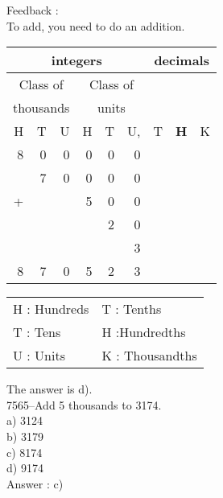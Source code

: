 \documentclass[letterpaper, 12pt]{article}
\begin{document}
Feedback :\\
To add, you need to do an addition.
\begin{center}
\begin{tabular}{|rrr|rrr|rrr|}
\hline
\multicolumn{6}{|c|}{integers} &\multicolumn{3}{|c|}{decimals} \\
\hline
\multicolumn{3}{|c|}{Class of} &\multicolumn{3}{|c|}{Class of} &  \multicolumn{3}{c|}{} \\
\multicolumn{3}{|c|}{thousands} &\multicolumn{3}{|c|}{units} &  \multicolumn{3}{c|}{} \\
\hline
H & T & U &H & T & U, & T\up{th} & \textbf{H\up{th}} & K\up{th} \\
\hline
\hline
8 & 0 & 0 & 0 & 0 & 0 &  & &\\
 & 7 & 0 & 0 & 0 & 0 &  & &\\
+ &  &  & 5 & 0 & 0 &  & &\\
 &  &  &  & 2 & 0 &  & &\\
 &  &  &  &  & 3 &  & &\\
\hline
\hline
 8 & 7 & 0 & 5 & 2 & 3 &  & &
\\
\hline
\end{tabular}
\end{center}

\scriptsize
\begin{center}
\begin{tabular}{ll}
H : Hundreds & T\up{th} : Tenths\\
T : Tens & H\up{th} :Hundredths\\
U : Units & K\up{e} : Thousandths\\
\end{tabular}
\end{center}

\normalsize
The answer is d).\\





7565--Add 5 thousands to 3174.\\

a) 3124\\
b) 3179\\
c) 8174\\
d) 9174\\

Answer : c)\\
\end{document}
